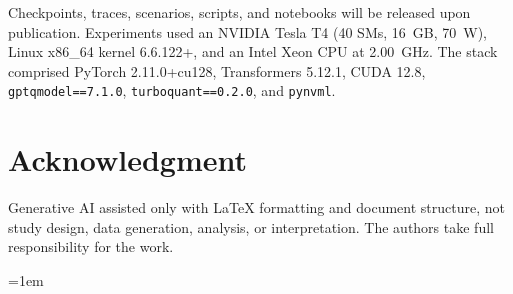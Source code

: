 \documentclass[conference,a4paper]{IEEEtran}
\begin{document}
Checkpoints, traces, scenarios, scripts, and notebooks will be released upon publication. Experiments used an NVIDIA Tesla T4 (40 SMs, 16~GB, 70~W), Linux x86\_64 kernel 6.6.122+, and an Intel Xeon CPU at 2.00~GHz. The stack comprised PyTorch 2.11.0+cu128, Transformers 5.12.1, CUDA 12.8, \texttt{gptqmodel==7.1.0}, \texttt{turboquant==0.2.0}, and \texttt{pynvml}.

\section*{Acknowledgment}
Generative AI assisted only with LaTeX formatting and document structure, not study design, data generation, analysis, or interpretation. The authors take full responsibility for the work.


\begingroup
\emergencystretch=1em

\endgroup
\end{document}
